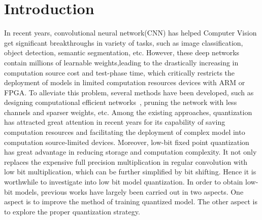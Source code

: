 \documentclass[letterpaper]{article} %
\begin{document}
\section{Introduction}
In recent years, convolutional neural network(CNN) has helped Computer Vision get significant breakthroughs in variety of tasks, 
such as image classification, object detection, semantic segmentation, etc.
However, these deep networks contain millions of learnable weights,leading to the drastically increasing in computation source cost and test-phase time,
which critically restricts the deployment of models in limited computation resources devices with ARM or FPGA. To alleviate this problem, several methods have been developed, such as 
designing computational efficient networks~\cite{howard2017mobilenets,hluchyj1991shuffle},
pruning the network with less channels and sparser weights\cite{he2017channel,liu2017learning}, etc.
Among the existing approaches, quantization has attracted great attention in recent years 
for its capability of saving computation resources 
and facilitating the deployment of complex model into computation source-limited devices. Moreover, low-bit fixed point quantization has great advantage in reducing storage and computation complexity. It not only replaces the expensive full precision multiplication in regular convolution with low bit multiplication, which can be further simplified by bit shifting. Hence it is worthwhile to investigate into low bit model quantization.
In order to obtain low-bit models, previous works have largely been carried out in two aspects. 
One aspect is to improve the method of training quantized model. 
The other aspect is to explore the proper quantization strategy.
\end{document}
